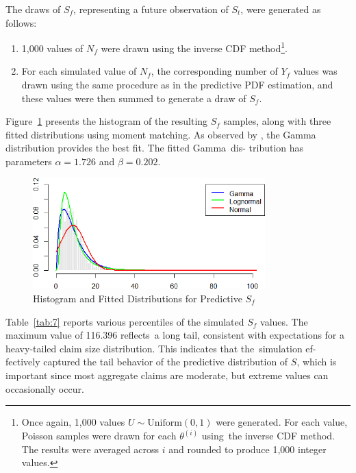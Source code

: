 \documentclass{Class/julia}
\begin{document}
The draws of \( S_f \), representing a future observation of \( S_t \), were generated as follows:

\begin{enumerate}
\item 1,000 values of \( N_f \) were drawn using the inverse CDF method\footnote{Once again, 1,000 values \( U \sim \mathrm{Uniform}(0, 1) \) were generated. For each value, Poisson samples were drawn for each \( \theta^{(i)} \) using~the inverse CDF method. The results were averaged across \( i \) and rounded to produce 1,000 integer values.}.
\item For each simulated value of \( N_f \), the corresponding number of \( Y_f \) values was drawn using the same procedure as in the predictive PDF estimation, and these values were then summed to generate a draw of \( S_f \).
\end{enumerate}

\noindent Figure~\ref{fig:10} presents the histogram of the resulting \( S_f \) samples, along with three fitted distributions using moment matching. As observed by \citet{dudley2006bayesian}, the Gamma distribution provides the best fit. The fitted Gamma~dis- tribution has parameters \( \alpha = 1.726 \) and \( \beta = 0.202 \).

\begin{figure}[!ht]
\centering
\caption{Histogram and Fitted Distributions for Predictive \( S_f \)}
\label{fig:10}
\includegraphics[width=0.8\textwidth]{rytgaard1990/predictive_S_f.png}
\end{figure}

Table~\ref{tab:7} reports various percentiles of the simulated \( S_f \) values. The maximum value of 116.396 reflects~a long tail, consistent with expectations for a heavy-tailed claim size distribution. This indicates that the~simulation ef- fectively captured the tail behavior of the predictive distribution of \( S \), which is important since most aggregate claims are moderate, but extreme values can occasionally occur.
\end{document}
